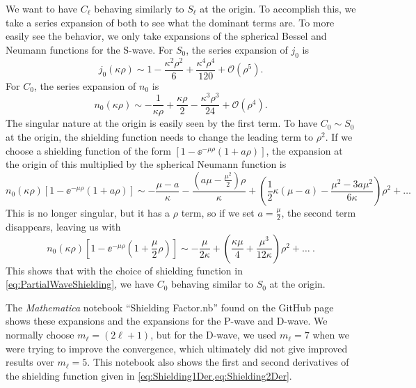 \documentclass[Dissertation.tex]{subfiles}
\begin{document}
We want to have $C_\ell$ behaving similarly to $S_\ell$ at the origin. To
accomplish this, we take a series expansion of both to see what the dominant
terms are. To more easily see the behavior, we only take expansions of the
spherical Bessel and Neumann functions for the S-wave. For $S_0$, the series expansion of
$j_0$ is
\begin{equation}
j_0(\kappa\rho) \sim 1 - \frac{\kappa^2 \rho^2}{6} + \frac{\kappa^4 \rho^4}{120} + \mathcal{O}(\rho^5).
\end{equation}
For $C_0$, the series expansion of $n_0$ is
\begin{equation}
n_0(\kappa\rho) \sim -\frac{1}{\kappa\rho} + \frac{\kappa \rho}{2} - \frac{\kappa^3 \rho^3}{24} + \mathcal{O}(\rho^4).
\end{equation}
The singular nature at the origin is easily seen by the first term. To have
$C_0 \sim S_0$ at the origin, the shielding function needs to change the
leading term to $\rho^2$. If we choose a shielding function of the form
$\left[1 - \ee^{-\mu \rho} \left(1+a \rho\right)\right]$, the
expansion at the origin of this multiplied by the spherical Neumann function is
\begin{equation}
n_0(\kappa\rho) \left[1 - \ee^{-\mu \rho} \left(1+a \rho\right)\right] \sim
-\frac{\mu-a}{\kappa} - \frac{\left(a\mu - \frac{\mu^2}{2}\right)\rho}{\kappa}
+ \left(\frac{1}{2}\kappa(\mu-a) - \frac{\mu^2 - 3 a \mu^2}{6\kappa}\right) \rho^2 + \ldots
\end{equation}
This is no longer singular, but it has a $\rho$ term, so if we set
$a = \frac{\mu}{2}$, the second term disappears, leaving us with
\begin{equation}
n_0(\kappa\rho) \left[1 - \ee^{-\mu \rho} \left(1+\frac{\mu}{2}\rho\right)\right] \sim
-\frac{\mu}{2\kappa} + \left(\frac{\kappa\mu}{4} + \frac{\mu^3}{12\kappa}\right) \rho^2 + \ldots \ .
\end{equation}
This shows that with the choice of shielding function in \cref{eq:PartialWaveShielding},
we have $C_0$ behaving similar to $S_0$ at the origin.

The \emph{Mathematica} notebook ``Shielding Factor.nb'' found on the GitHub
page \cite{GitHub} shows these expansions and the expansions for the P-wave
and D-wave. We normally choose $m_\ell = (2\ell+1)$, but for the D-wave, we
used $m_\ell = 7$ when we were trying to improve the convergence, which
ultimately did not give improved results over $m_\ell = 5$. This notebook
also shows the first and second derivatives of the shielding function given
in \cref{eq:Shielding1Der,eq:Shielding2Der}.
\end{document}
